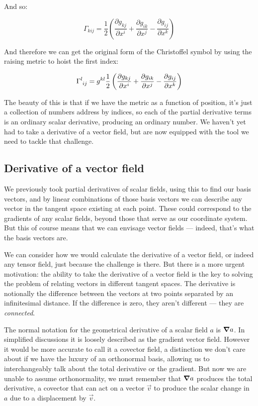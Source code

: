 And so:

\begin{equation}
\Gamma_{kij}
=
\frac{1}{2}
\left(
\frac{\partial g_{kj}}{\partial x^i} 
+
\frac{\partial g_{ik}}{\partial x^j} 
-
\frac{\partial g_{ij}}{\partial x^k} 
\right)
\end{equation}

And therefore we can get the original form of the Christoffel symbol by using the raising metric to hoist the first index:

\begin{equation}
\Gamma\indices{^l_i_j}
=
g^{kl}
\frac{1}{2}
\left(
\frac{\partial g_{kj}}{\partial x^i} 
+
\frac{\partial g_{ik}}{\partial x^j} 
-
\frac{\partial g_{ij}}{\partial x^k} 
\right)
\end{equation}

The beauty of this is that if we have the metric as a function of position, it's just a collection of numbers address by indices, so each of the partial derivative terms is an ordinary scalar derivative, producing an ordinary number. We haven't yet had to take a derivative of a vector field, but are now equipped with the tool we need to tackle that challenge.

\subsection{Derivative of a vector field}

We previously took partial derivatives of scalar fields, using this to find our basis vectors, and by linear combinations of those basis vectors we can describe any vector in the tangent space existing at each point. These could correspond to the gradients of any scalar fields, beyond those that serve as our coordinate system. But this of course means that we can envisage vector fields --- indeed, that's what the basis vectors are.

We can consider how we would calculate the derivative of a vector field, or indeed any tensor field, just because the challenge is there. But there is a more urgent motivation: the ability to take the derivative of a vector field is the key to solving the problem of relating vectors in different tangent spaces. The derivative is notionally the difference between the vectors at two points separated by an infinitesimal distance. If the difference is zero, they aren't different --- they are \textit{connected}.

The normal notation for the geometrical derivative of a scalar field $a$ is $\grad a$. In simplified discussions it is loosely described as the gradient vector field. However it would be more accurate to call it a covector field, a distinction we don't care about if we have the luxury of an orthonormal basis, allowing us to interchangeably talk about the total derivative or the gradient. But now we are unable to assume orthonormality, we must remember that $\grad a$ produces the total derivative, a covector that can act on a vector $\vec{v}$ to produce the scalar change in $a$ due to a displacement by $\vec{v}$.

